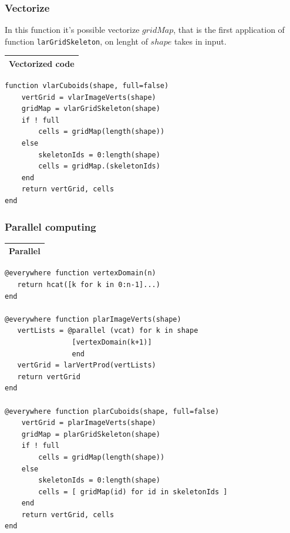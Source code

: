 \documentclass{article}
\begin{document}
\vspace{2ex}

\subsubsection{Vectorize}
In this function it's possible vectorize $gridMap$, that is the first application of function \texttt{larGridSkeleton}, on lenght of $shape$ takes in input.
\vspace{1ex}
\begin{flushleft} \small
\begin{center}
\begin{tabular}{|p{16cm}|}
\hline
\cellcolor[gray]{.9}Vectorized code\\
\hline
\end{tabular}
\end{center}
\vspace{2ex}
\begin{list}{}{} \item
   \begin{Verbatim}[tabsize=4]
function vlarCuboids(shape, full=false)
    vertGrid = vlarImageVerts(shape)
    gridMap = vlarGridSkeleton(shape)
    if ! full
        cells = gridMap(length(shape))
    else
        skeletonIds = 0:length(shape)
        cells = gridMap.(skeletonIds)
    end
    return vertGrid, cells
end
   \end{Verbatim}
\end{list}
\end{flushleft}
\vspace{2ex}

\subsubsection{Parallel computing}
\vspace{1ex}
\begin{flushleft} \small
\begin{center}
\begin{tabular}{|p{16cm}|}
\hline
\cellcolor[gray]{.9}Parallel\\
\hline
\end{tabular}
\end{center}
\vspace{2ex}
\begin{list}{}{} \item
   \begin{Verbatim}[tabsize=4]
@everywhere function vertexDomain(n)
   return hcat([k for k in 0:n-1]...)
end

@everywhere function plarImageVerts(shape)
   vertLists = @parallel (vcat) for k in shape 
                [vertexDomain(k+1)]
                end
   vertGrid = larVertProd(vertLists)
   return vertGrid
end

@everywhere function plarCuboids(shape, full=false)
    vertGrid = plarImageVerts(shape)
    gridMap = plarGridSkeleton(shape)
    if ! full
        cells = gridMap(length(shape))
    else
        skeletonIds = 0:length(shape)
        cells = [ gridMap(id) for id in skeletonIds ]
    end
    return vertGrid, cells
end
   \end{Verbatim}
\end{list}
\end{flushleft}
\end{document}
